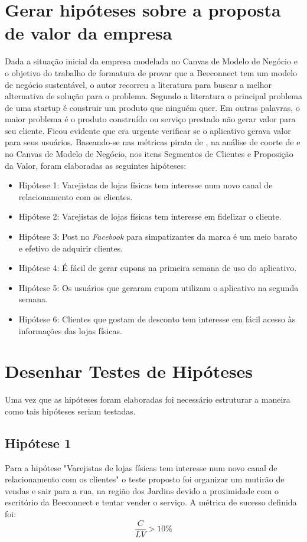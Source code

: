 \section{Gerar hipóteses sobre a proposta de valor da empresa}
\label{cha:gerar_hipoteses}
Dada a situação inicial da empresa modelada no Canvas de Modelo de Negócio e o objetivo do trabalho de formatura de provar que a Beeconnect tem um modelo de negócio sustentável, o autor recorreu a literatura para buscar a melhor alternativa de solução para o problema. 
Segundo a literatura o principal problema de uma startup é construir um produto que ninguém quer. Em outras palavras, o maior problema é o produto construído ou serviço prestado não gerar valor para seu cliente.
Ficou evidente que era urgente verificar se o aplicativo gerava valor para seus usuários. Baseando-se nas métricas pirata de , na análise de coorte de  e no Canvas de Modelo de Negócio, nos itens Segmentos de Clientes e Proposição da Valor, foram elaboradas as seguintes hipóteses:
\begin{itemize}
\item Hipótese 1: Varejistas de lojas físicas tem interesse num novo canal de relacionamento com os clientes.
\item Hipótese 2: Varejistas de lojas físicas tem interesse em fidelizar o cliente.
\item Hipótese 3: Post no \textit{Facebook} para simpatizantes da marca é um meio barato e efetivo de adquirir clientes.
\item Hipótese 4: É fácil de gerar cupons na primeira semana de uso do aplicativo.
\item Hipótese 5: Os usuários que geraram cupom utilizam o aplicativo na segunda semana.
\item Hipótese 6: Clientes que gostam de desconto tem interesse em fácil acesso às informações das lojas físicas.
\end{itemize}

\section{Desenhar Testes de Hipóteses}
\label{cha:desenhar_hipoteses}
Uma vez que as hipóteses foram elaboradas foi necessário estruturar a maneira como tais hipóteses seriam testadas. 

\subsection{Hipótese 1}
\label{cha:hip_1}
Para a hipótese "Varejistas de lojas físicas tem interesse num novo canal de relacionamento com os clientes" o teste proposto foi organizar um mutirão de vendas e sair para a rua, na região dos Jardins devido a proximidade com o escritório da Beeconnect e tentar vender o serviço. A métrica de sucesso definida foi:
\[ \dfrac{C}{LV} > 10\%\]

